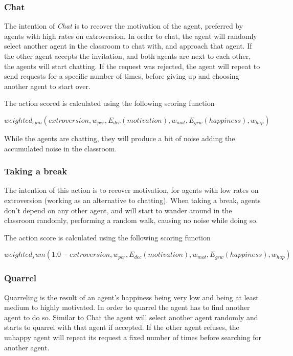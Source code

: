 \subsubsection{Chat}
The intention of \textit{Chat} is to recover the motivation of the agent, preferred
by agents with high rates on extroversion. In order to chat, the agent will
randomly select another agent in the classroom to chat with, and approach that agent.
If the other agent accepts the invitation, and both agents are next to each other,
the agents will start chatting. If the request was rejected, the agent will repeat
to send requests for a specific number of times, before giving up and choosing
another agent to start over.

The action scored is calculated using the following scoring function

\begin{equation}
    weighted_{sum}(extroversion, w_{per}, E_{dec}(motivation), w_{mot}, E_{grw}(happiness), w_{hap})
\end{equation}

While the agents are chatting, they will produce a bit of noise adding the
accumulated noise in the classroom.

\subsubsection{Taking a break}
The intention of this action is to recover motivation, for agents
with low rates on extroversion (working as an alternative to chatting).
When taking a break, agents don't depend on any other agent, and will start to
wander around in the classroom randomly, performing a random walk, causing no noise
while doing so.

The action score is calculated using the following scoring function

\begin{equation}
    weighted_sum(1.0 - extroversion, w_{per}, E_{dec}(motivation), w_{mot}, E_{grw}(happiness), w_{hap})
\end{equation}

\subsubsection{Quarrel}
Quarreling is the result of an agent's happiness being very low and being at least
medium to highly motivated. In order to quarrel the agent has to find another agent
to do so. Similar to Chat the agent will select another agent randomly and starts
to quarrel with that agent if accepted. If the other agent refuses, the unhappy
agent will repeat its request a fixed number of times before searching for another agent.

